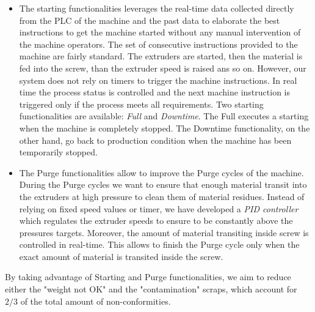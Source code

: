 \begin{itemize}
    \item The starting functionalities leverages the real-time data collected directly from the PLC of the machine and the past data to elaborate the best instructions to get the machine started without any manual intervention of the machine operators. The set of consecutive instructions provided to the machine are fairly standard. The extruders are started, then the material is fed into the screw, than the extruder speed is raised ans so on. However, our system does not rely on timers to trigger the machine instructions. In real time the process status is controlled and the next machine instruction is triggered only if the process meets all requirements.
    Two starting functionalities are available: \textit{Full} and \textit{Downtime}. The Full executes a starting when the machine is completely stopped. The Downtime functionality, on the other hand, go back to production condition when the machine has been temporarily stopped.
    \item The Purge functionalities allow to improve the Purge cycles of the machine.
    During the Purge cycles we want to ensure that enough material transit into the extruders at high pressure to clean them of material residues. Instead of relying on fixed speed values or timer, we have developed a \textit{PID controller} which regulates the extruder speeds to ensure to be constantly above the pressures targets. Moreover, the amount of material transiting inside screw is controlled in real-time. This allows to finish the Purge cycle only when the exact amount of material is transited inside the screw.     
\end{itemize}
%
By taking advantage of Starting and Purge functionalities, we aim to reduce either the "weight not OK" and the "contamination" scraps, which account for $2/3$ of the total amount of non-conformities.

